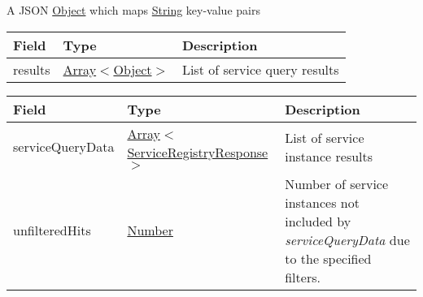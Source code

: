 \documentclass[a4paper]{arrowhead}
\newcommand{\pref}[1]{{\textcolor{ArrowheadGrey}{\hyperref[sec:model:primitives:#1]{#1}}}}
\begin{document}

A JSON \pref{Object} which maps \pref{String} key-value pairs

\clearpage


\begin{table}[ht!]
\begin{tabularx}{\textwidth}{| p{4.25cm} | p{3.5cm} | X |} \hline
\rowcolor{gray!33} Field & Type      & Description \\ \hline
results & \pref{Array}$<$\pref{Object}$>$     & List of service query results \\ \hline
\end{tabularx}
\end{table}


\begin{table}[ht!]
\begin{tabularx}{\textwidth}{| p{3cm} | p{6cm} | X |} \hline
\rowcolor{gray!33} Field & Type      & Description \\ \hline
serviceQueryData & \pref{Array}$<$\pref{ServiceRegistryResponse}$>$     & List of service instance results \\ \hline
unfilteredHits & \pref{Number} & Number of service instances not included by \textit{serviceQueryData} due to the specified filters. \\ \hline
\end{tabularx}
\end{table}

\end{document}
